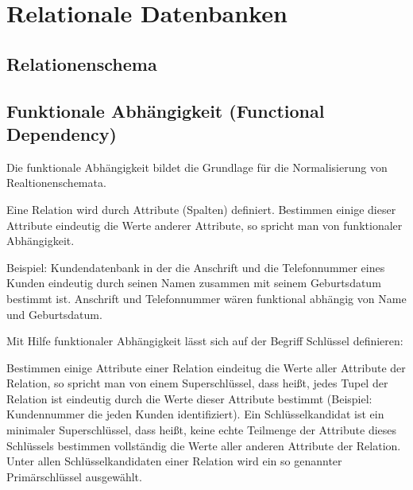 \documentclass{scrbook}
\begin{document}
\tableofcontents

\newpage
\chapter{Relationale Datenbanken}

\section{Relationenschema}




\section{Funktionale Abhängigkeit (Functional Dependency)}	%

Die funktionale Abhängigkeit bildet die Grundlage für die Normalisierung von Realtionenschemata.

Eine Relation wird durch Attribute (Spalten) definiert.
Bestimmen einige dieser Attribute eindeutig die Werte anderer Attribute,
so spricht man von funktionaler Abhängigkeit.

Beispiel:
Kundendatenbank in der die Anschrift und die Telefonnummer eines Kunden eindeutig durch
seinen Namen zusammen mit seinem Geburtsdatum bestimmt ist.
Anschrift und Telefonnummer wären funktional abhängig von Name und Geburtsdatum.

Mit Hilfe funktionaler Abhängigkeit lässt sich auf der Begriff Schlüssel definieren:

Bestimmen einige Attribute einer Relation eindeitug die Werte aller Attribute der Relation,
so spricht man von einem Superschlüssel, dass heißt, jedes Tupel der Relation ist eindeutig
durch die Werte dieser Attribute bestimmt (Beispiel: Kundennummer die jeden Kunden identifiziert).
Ein Schlüsselkandidat ist ein minimaler Superschlüssel, dass heißt, keine echte Teilmenge
der Attribute dieses Schlüssels bestimmen vollständig die Werte aller anderen Attribute der Relation.
Unter allen Schlüsselkandidaten einer Relation wird ein so genannter Primärschlüssel ausgewählt.
\end{document}

